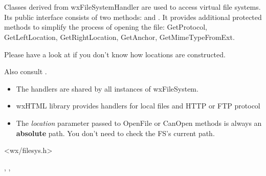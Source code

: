 %
%

\section{}\label{wxfilesystemhandler}

Classes derived from wxFileSystemHandler are used
to access virtual file systems. Its public interface consists
of two methods:  
and . 
It provides additional protected methods to simplify the process
of opening the file: GetProtocol, GetLeftLocation, GetRightLocation,
GetAnchor, GetMimeTypeFromExt.

Please have a look at  if you don't know how locations
are constructed.

Also consult .



\begin{itemize}\itemsep=0pt
\item The handlers are shared by all instances of wxFileSystem.
\item wxHTML library provides handlers for local files and HTTP or FTP protocol
\item The {\it location} parameter passed to OpenFile or CanOpen methods
is always an {\bf absolute} path. You don't need to check the FS's current path.
\end{itemize}




<wx/filesys.h>


, 
, 



\label{wxfilesystemhandlerwxfilesystemhandler}


